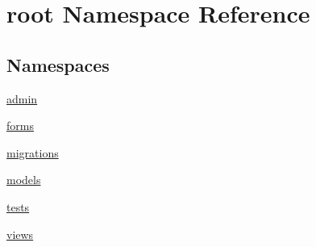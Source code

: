 \hypertarget{namespaceroot}{\section{root Namespace Reference}
\label{namespaceroot}
}
\subsection*{Namespaces}
\begin{DoxyCompactItemize}
\item 
\hyperlink{namespaceroot_1_1admin}{admin}
\item 
\hyperlink{namespaceroot_1_1forms}{forms}
\item 
\hyperlink{namespaceroot_1_1migrations}{migrations}
\item 
\hyperlink{namespaceroot_1_1models}{models}
\item 
\hyperlink{namespaceroot_1_1tests}{tests}
\item 
\hyperlink{namespaceroot_1_1views}{views}
\end{DoxyCompactItemize}
